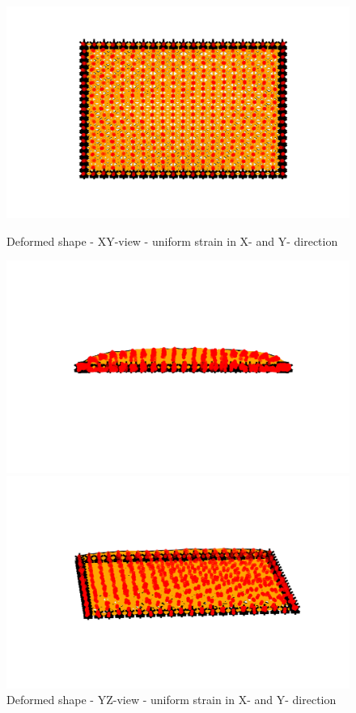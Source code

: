 \begin{figure}[!htbp]
\begin{minipage}{0.3\textwidth}
    \centering
    \includegraphics[width = 1\textwidth]{Figures/Uniform_XY_xxyy.png}
    \caption{Deformed shape - XY-view - uniform strain in X- and Y- direction}
    \label{fig:uniform_xxyy_xy}
\end{minipage}
\hspace{5mm}
\begin{minipage}{0.3\textwidth}
    \centering
    \includegraphics[width = 1\textwidth]{Figures/Uniform_YZ_xxyy.png}
    \caption{Deformed shape - YZ-view - uniform strain in X- and Y- direction}
    \label{fig:uniform_xxyy_yz}
\end{minipage}
\hspace{5mm}
\begin{minipage}{0.3\textwidth}
    \centering
    \includegraphics[width = 1\textwidth]{Figures/Uniform_3D_xxyy.png}

\end{minipage}
\end{figure}
